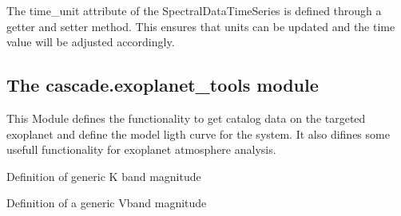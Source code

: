 \documentclass[a4paper,10pt,english]{sphinxmanual}
\begin{document}
\begin{fulllineitems}

\begin{fulllineitems}
\label{\detokenize{cascade.data_model:cascade.data_model.data_model.SpectralDataTimeSeries.time_unit}}
The time\_unit attribute of the SpectralDataTimeSeries is defined
through a getter and setter method. This ensures that units can be
updated and the time value will be adjusted accordingly.

\end{fulllineitems}


\end{fulllineitems}



\subsection{The cascade.exoplanet\_tools module}
\label{\detokenize{cascade.exoplanet_tools:module-cascade.exoplanet_tools.exoplanet_tools}}\label{\detokenize{cascade.exoplanet_tools:the-cascade-exoplanet-tools-module}}\label{\detokenize{cascade.exoplanet_tools::doc}}
This Module defines the functionality to get catalog data on the targeted
exoplanet and define the model ligth curve for the system.
It also difines some usefull functionality for exoplanet atmosphere analysis.

\begin{fulllineitems}
\label{\detokenize{cascade.exoplanet_tools:cascade.exoplanet_tools.exoplanet_tools.Kmag}}
Definition of generic K band magnitude

\end{fulllineitems}


\begin{fulllineitems}
\label{\detokenize{cascade.exoplanet_tools:cascade.exoplanet_tools.exoplanet_tools.Vmag}}
Definition of a generic Vband magnitude

\end{fulllineitems}
\end{document}
